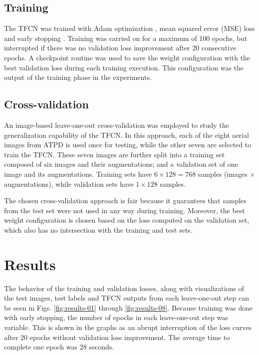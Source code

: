 \documentclass[conference]{IEEEtran}
\begin{document}
\subsection{Training}

The TFCN was trained with Adam optimization \cite{kingma:2015}, mean squared error (MSE) loss and early stopping \cite{prechelt:2012}.
Training was carried on for a maximum of 100 epochs, but interrupted if there was no validation loss improvement after 20 consecutive epochs.
A checkpoint routine was used to save the weight configuration with the best validation loss during each training execution.
This configuration was the output of the training phase in the experiments.

\subsection{Cross-validation}

An image-based leave-one-out cross-validation was employed to study the generalization capability of the TFCN.
In this approach, each of the eight aerial images from ATPD is used once for testing, while the other seven are selected to train the TFCN.
These seven images are further split into a training set composed of six images and their augmentations; and a validation set of one image and its augmentations.
Training sets have $6 \times 128 = 768$ samples (images $\times$ augmentations), while validation sets have $1 \times 128$ samples.

The chosen cross-validation approach is fair because it guarantees that samples from the test set were not used in any way during training.
Moreover, the best weight configuration is chosen based on the loss computed on the validation set, which also has no intersection with the training and test sets.

\section{Results}
\label{section:results}

The behavior of the training and validation losses, along with visualizations of the test images, test labels and TFCN outputs from each leave-one-out step can be seen in Figs. \ref{fig:results-01} through \ref{fig:results-08}.
Because training was done with early stopping, the number of epochs in each leave-one-out step was variable.
This is shown in the graphs as an abrupt interruption of the loss curves after 20 epochs without validation loss improvement.
The average time to complete one epoch was 28 seconds.
\end{document}
